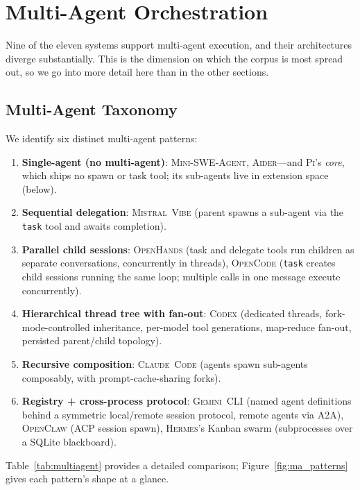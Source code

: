 \documentclass[11pt,a4paper]{article}
\newcommand{\clcode}{\textsc{Claude~Code}\xspace}
\newcommand{\cdx}{\textsc{Codex}\xspace}
\newcommand{\oh}{\textsc{OpenHands}\xspace}
\newcommand{\adr}{\textsc{Aider}\xspace}
\newcommand{\mswe}{\textsc{Mini-SWE-Agent}\xspace}
\newcommand{\ocl}{\textsc{OpenClaw}\xspace}
\newcommand{\vibe}{\textsc{Mistral~Vibe}\xspace}
\newcommand{\gemini}{\textsc{Gemini~CLI}\xspace}
\newcommand{\hrm}{\textsc{Hermes}\xspace}
\newcommand{\pib}{\textsc{Pi}\xspace}
\newcommand{\ocd}{\textsc{OpenCode}\xspace}
\begin{document}
\section{Multi-Agent Orchestration}
\label{sec:multiagent}

Nine of the eleven systems support multi-agent execution, and their architectures diverge substantially.
This is the dimension on which the corpus is most spread out, so we go into more detail here than in the other sections.

\subsection{Multi-Agent Taxonomy}

We identify six distinct multi-agent patterns:

\begin{enumerate}[itemsep=1pt]
  \item \textbf{Single-agent (no multi-agent)}: \mswe{}, \adr{}---and \pib{}'s \emph{core}, which ships no spawn or task tool; its sub-agents live in extension space (below).
  \item \textbf{Sequential delegation}: \vibe{} (parent spawns a sub-agent via the \texttt{task} tool and awaits completion).
  \item \textbf{Parallel child sessions}: \oh{} (task and delegate tools run children as separate conversations, concurrently in threads), \ocd{} (\texttt{task} creates child sessions running the same loop; multiple calls in one message execute concurrently).
  \item \textbf{Hierarchical thread tree with fan-out}: \cdx{} (dedicated threads, fork-mode-controlled inheritance, per-model tool generations, map-reduce fan-out, persisted parent/child topology).
  \item \textbf{Recursive composition}: \clcode{} (agents spawn sub-agents composably, with prompt-cache-sharing forks).
  \item \textbf{Registry + cross-process protocol}: \gemini{} (named agent definitions behind a symmetric local/remote session protocol, remote agents via A2A), \ocl{} (ACP session spawn), \hrm{}'s Kanban swarm (subprocesses over a SQLite blackboard).
\end{enumerate}

Table~\ref{tab:multiagent} provides a detailed comparison; Figure~\ref{fig:ma_patterns} gives each pattern's shape at a glance.
\end{document}
